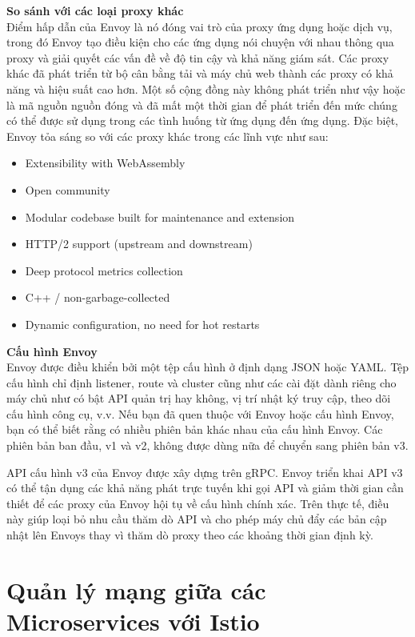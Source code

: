 \documentclass[12pt,a4paper]{report}
\begin{document}
		\textbf{So sánh với các loại proxy khác}\\
		Điểm hấp dẫn của Envoy là nó đóng vai trò của proxy ứng dụng hoặc dịch vụ, trong đó Envoy tạo điều kiện cho các ứng dụng nói chuyện với nhau thông qua proxy và giải quyết các vấn đề về độ tin cậy và khả năng giám sát. Các proxy khác đã phát triển từ bộ cân bằng tải và máy chủ web thành các proxy có khả năng và hiệu suất cao hơn. Một số cộng đồng này không phát triển như vậy hoặc là mã nguồn nguồn đóng và đã mất một thời gian để phát triển đến mức chúng có thể được sử dụng trong các tình huống từ ứng dụng đến ứng dụng. Đặc biệt, Envoy tỏa sáng so với các proxy khác trong các lĩnh vực như sau:
		\begin{itemize}
			\item Extensibility with WebAssembly
			\item Open community
			\item Modular codebase built for maintenance and extension
			\item HTTP/2 support (upstream and downstream)
			\item Deep protocol metrics collection
			\item C++ / non-garbage-collected
			\item Dynamic configuration, no need for hot restarts
		\end{itemize}
	
		\textbf{Cấu hình Envoy}\\
		
		Envoy được điều khiển bởi một tệp cấu hình ở định dạng JSON hoặc YAML. Tệp cấu hình chỉ định listener, route và cluster cũng như các cài đặt dành riêng cho máy chủ như có bật API quản trị hay không, vị trí nhật ký truy cập, theo dõi cấu hình công cụ, v.v. Nếu bạn đã quen thuộc với Envoy hoặc cấu hình Envoy, bạn có thể biết rằng có nhiều phiên bản khác nhau của cấu hình Envoy. Các phiên bản ban đầu, v1 và v2, không được dùng nữa để chuyển sang phiên bản v3.
		
		API cấu hình v3 của Envoy được xây dựng trên gRPC. Envoy triển khai API v3 có thể tận dụng các khả năng phát trực tuyến khi gọi API và giảm thời gian cần thiết để các proxy của Envoy hội tụ về cấu hình chính xác. Trên thực tế, điều này giúp loại bỏ nhu cầu thăm dò API và cho phép máy chủ đẩy các bản cập nhật lên Envoys thay vì thăm dò proxy theo các khoảng thời gian định kỳ.
	\section{Quản lý mạng giữa các Microservices với Istio}
\end{document}
